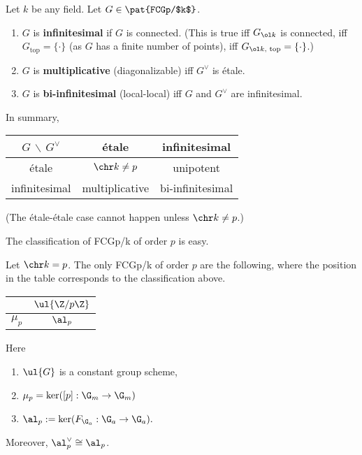 \begin{df}
Let $k$ be any field. %
Let $G\in \pat{FCGp/$k$}$.
\begin{enumerate}
\item
$G$ is \textbf{infinitesimal} if $G$ is connected. (This is true iff $G_{\ol k}$ is connected, iff $G_{\text{top}}=\{\cdot\}$ (as $G$ has a finite number of points), iff $G_{\ol k,\text{ top}}=\{\cdot \}$.)
\item
$G$ is \textbf{multiplicative} (diagonalizable) iff $G^{\vee}$ is \'etale.
\item
$G$ is \textbf{bi-infinitesimal} (local-local) iff $G$ and $G^{\vee}$ are infinitesimal.
\end{enumerate}
\end{df}
In summary,
\begin{center}

\begin{tabular}{|c|c|c|}
\hline 
$G\,\backslash\, G^{\vee}$  & \'etale & infinitesimal\tabularnewline
\hline 
\'etale & $\chr k\ne p$ & unipotent\tabularnewline
\hline 
infinitesimal & multiplicative & bi-infinitesimal\tabularnewline
\hline 
\end{tabular}
\end{center}

(The \'etale-\'etale case cannot happen unless $\chr k\ne p$.)

The classification of FCGp/k of order $p$  is easy.
\begin{pr}
Let $\chr k=p$.
The only FCGp/k of order $p$ are the following, where the position in the table corresponds to the classification above.

\begin{center}
\begin{tabular}{|c|c|}
\cline{2-2} 
\multicolumn{1}{c|}{} & $\ul{\Z/p\Z}$\tabularnewline
\hline 
$\mu_{p}$ & $\al_{p}$\tabularnewline
\hline 
\end{tabular}
\end{center}

Here 
\begin{enumerate}
\item
$\ul{G}$ is a constant group scheme,
\item
$
\mu_p=\ker([p]:\G_m\to \G_m)
$
\item 
$
\al_p:=\ker(F_{\G_a}:\G_a\to \G_a).
$
\end{enumerate}
Moreover, $\al_p^{\vee}\cong \al_p$.
\end{pr}

